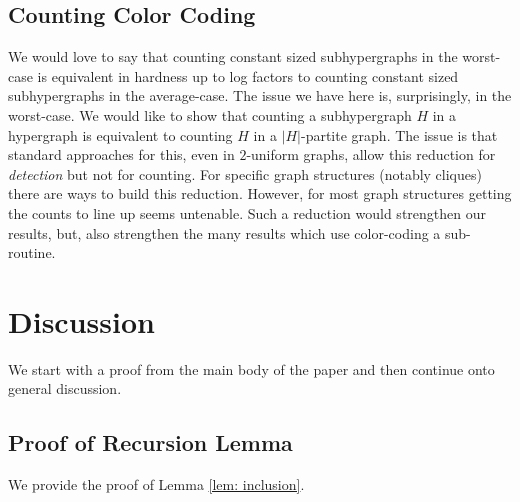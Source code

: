 \documentclass[11pt,letterpaper,pdftex]{article}
\begin{document}
\subsection{Counting Color Coding}

We would love to say that counting constant sized subhypergraphs in the worst-case is equivalent in hardness up to log factors to counting constant sized subhypergraphs in the average-case. The issue we have here is, surprisingly, in the worst-case. We would like to show that counting a subhypergraph $H$ in a hypergraph is equivalent to counting $H$ in a $|H|$-partite graph. The issue is that standard approaches for this, even in $2$-uniform graphs, allow this reduction for \emph{detection} but not for counting. For specific graph structures (notably cliques) there are ways to build this reduction. However, for most graph structures getting the counts to line up seems untenable. Such a reduction would strengthen our results, but, also strengthen the many results which use color-coding a sub-routine.  
\let\realbibitem=\bibitem
\def\bibitem{\par \vspace{-0.5ex}\realbibitem}


 

\appendix






\section{Discussion}
\label{sec:appendix_discussion}
We start with a proof from the main body of the paper and then continue onto general discussion. 

\subsection{Proof of Recursion Lemma}
\label{sec: appendixLemmaRecursion}

We provide the proof of Lemma \ref{lem: inclusion}.
\end{document}
